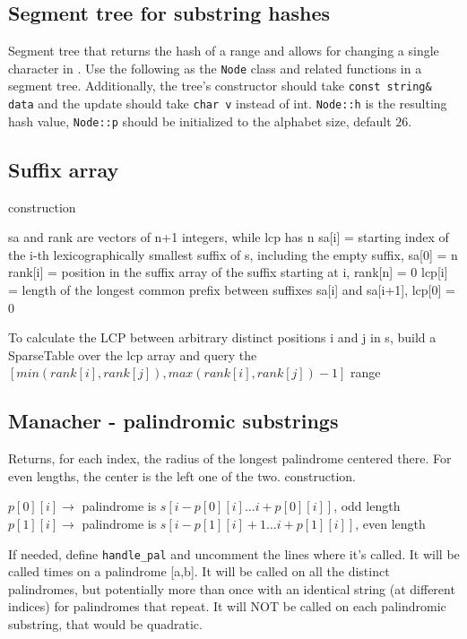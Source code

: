 \subsection{Segment tree for substring hashes}

Segment tree that returns the hash of a range and allows for changing a single character in . Use the following as the \verb|Node| class and related functions in a segment tree. Additionally, the tree's constructor should take \verb|const string& data| and the update should take \verb|char v| instead of int. \verb|Node::h| is the resulting hash value, \verb|Node::p| should be initialized to the alphabet size, default $26$.


\subsection{Suffix array}
 construction

sa and rank are vectors of n+1 integers, while lcp has n
sa[i] = starting index of the i-th lexicographically
  smallest suffix of s, including the empty suffix, sa[0] = n
rank[i] = position in the suffix array of the suffix starting at i, rank[n] = 0
lcp[i] = length of the longest common prefix between
  suffixes sa[i] and sa[i+1], lcp[0] = 0

To calculate the LCP between arbitrary distinct positions i and j in s, build a SparseTable over the lcp array and query the $[min(rank[i],rank[j]),max(rank[i],rank[j])-1]$ range

\subsection{Manacher - palindromic substrings}
Returns, for each index, the radius of the longest palindrome centered there. For even lengths, the center is the left one of the two.  construction.

\begin{flushleft}
$p[0][i] \xrightarrow{}$ palindrome is $s[i-p[0][i] \ldots i+p[0][i]]$, odd length \\
$p[1][i] \xrightarrow{}$ palindrome is $s[i-p[1][i]+1 \ldots i+p[1][i]]$, even length
\end{flushleft}

If needed, define \texttt{handle\_pal} and uncomment the lines where it's called. It will be called  times on a palindrome [a,b]. It will be called on all the distinct palindromes, but potentially more than once with an identical string (at different indices) for palindromes that repeat. It will NOT be called on each palindromic substring, that would be quadratic.

